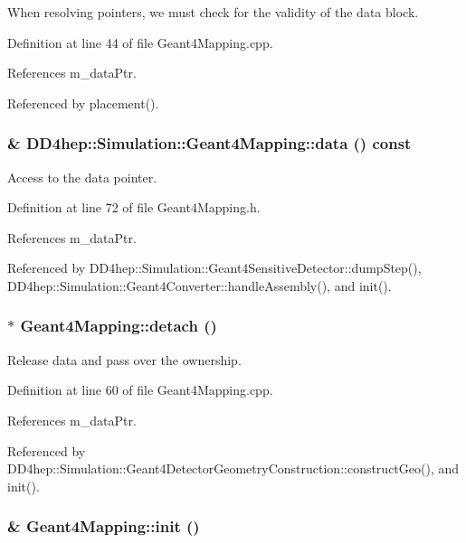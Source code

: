 When resolving pointers, we must check for the validity of the data block. 

Definition at line 44 of file Geant4Mapping.cpp.

References m\_\-dataPtr.

Referenced by placement().\hypertarget{class_d_d4hep_1_1_simulation_1_1_geant4_mapping_ae4f8df1c20c159dc7e467119d16e964c}{
\subsubsection[{data}]{\& DD4hep::Simulation::Geant4Mapping::data () const}}
\label{class_d_d4hep_1_1_simulation_1_1_geant4_mapping_ae4f8df1c20c159dc7e467119d16e964c}


Access to the data pointer. 

Definition at line 72 of file Geant4Mapping.h.

References m\_\-dataPtr.

Referenced by DD4hep::Simulation::Geant4SensitiveDetector::dumpStep(), DD4hep::Simulation::Geant4Converter::handleAssembly(), and init().\hypertarget{class_d_d4hep_1_1_simulation_1_1_geant4_mapping_a9d02ac3bbf930ce7a07694a296eaa8a2}{
\subsubsection[{detach}]{ $\ast$ Geant4Mapping::detach ()}}
\label{class_d_d4hep_1_1_simulation_1_1_geant4_mapping_a9d02ac3bbf930ce7a07694a296eaa8a2}


Release data and pass over the ownership. 

Definition at line 60 of file Geant4Mapping.cpp.

References m\_\-dataPtr.

Referenced by DD4hep::Simulation::Geant4DetectorGeometryConstruction::constructGeo(), and init().\hypertarget{class_d_d4hep_1_1_simulation_1_1_geant4_mapping_a241f6e8f761d19caf370fe43fbf22015}{
\subsubsection[{init}]{ \& Geant4Mapping::init ()}}
\label{class_d_d4hep_1_1_simulation_1_1_geant4_mapping_a241f6e8f761d19caf370fe43fbf22015}


